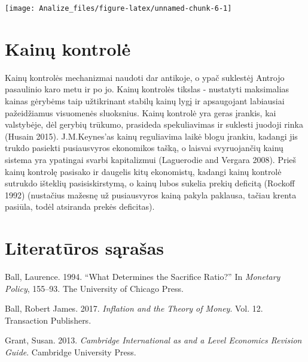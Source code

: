 \documentclass[
]{article}
\let\origfigure\figure
\let\endorigfigure\endfigure
\renewenvironment{figure}[1][2] {
    \expandafter\origfigure\expandafter[H]
} {
    \endorigfigure
}
\begin{document}
\begin{figure}

{\centering \texttt{[image: Analize\_files/figure-latex/unnamed-chunk-6-1]} 

}

\caption{JAV vyriausybės išlaidų ir infliacijos ryšys (1960-2019m).}\label{fig:unnamed-chunk-6}
\end{figure}

\hypertarget{kainux173-kontrolux117}{%
\section{Kainų kontrolė}\label{kainux173-kontrolux117}}

Kainų kontrolės mechanizmai naudoti dar antikoje, o ypač suklestėj
Antrojo pasaulinio karo metu ir po jo. Kainų kontrolės tikslas -
nustatyti maksimalias kainas gėrybėms taip užtikrinant stabilų kainų
lygį ir apsaugojant labiausiai pažeidžiamus visuomenės sluoksnius. Kainų
kontrolė yra geras įrankis, kai valstybėje, dėl gerybių trūkumo,
prasideda spekuliavimas ir suklesti juodoji rinka (Husain 2015).
J.M.Keynes'as kainų reguliavima laikė blogu įrankiu, kadangi jis trukdo
pasiekti pusiausvyros ekonomikos tašką, o laisvai svyruojančių kainų
sistema yra ypatingai svarbi kapitalizmui (Laguerodie and Vergara 2008).
Prieš kainų kontrolę pasisako ir daugelis kitų ekonomistų, kadangi kainų
kontrolė sutrukdo išteklių pasisiskirstymą, o kainų lubos sukelia prekių
deficitą (Rockoff 1992) (nustačius mažesnę už pusiausvyros kainą pakyla
paklausa, tačiau krenta pasiūla, todėl atsiranda prekės deficitas).

\newpage

\hypertarget{literatux16bros-sux105raux161as}{%
\section*{Literatūros sąrašas}\label{literatux16bros-sux105raux161as}}

\hypertarget{refs}{}
\leavevmode\hypertarget{ref-ball1994determines}{}%
Ball, Laurence. 1994. ``What Determines the Sacrifice Ratio?'' In
\emph{Monetary Policy}, 155--93. The University of Chicago Press.

\leavevmode\hypertarget{ref-ball2017inflation}{}%
Ball, Robert James. 2017. \emph{Inflation and the Theory of Money}. Vol.
12. Transaction Publishers.

\leavevmode\hypertarget{ref-grant2013cambridge}{}%
Grant, Susan. 2013. \emph{Cambridge International as and a Level
Economics Revision Guide}. Cambridge University Press.
\end{document}
